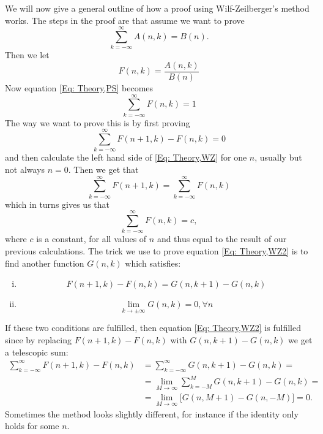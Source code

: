 We will now give a general outline of how a proof using Wilf-Zeilberger's method works. The steps in the proof are that assume we want to prove
\begin{equation}\label{Eq: Theory,PS}
  \sum_{k=-\infty}^\infty A(n,k) = B(n).
\end{equation}
Then we let
\begin{equation}
  F(n,k)=\frac{A(n,k)}{B(n)}
\end{equation}
Now equation \ref{Eq: Theory,PS} becomes
\begin{equation}\label{Eq: Theory,WZ}
  \sum_{k=-\infty}^\infty F(n,k) = 1
\end{equation}
The way we want to prove this is by first proving
\begin{equation}\label{Eq: Theory,WZ2}
  \sum_{k=-\infty}^\infty F(n+1,k)-F(n,k) = 0
\end{equation}
and then calculate the left hand side of \ref{Eq: Theory,WZ} for one $n$, usually but not always $n=0$. Then we get that
\begin{equation}
  \sum_{k=-\infty}^\infty F(n+1,k)=\sum_{k=-\infty}^\infty F(n,k)
\end{equation}
which in turns gives us that
\begin{equation}
  \sum_{k=-\infty}^\infty F(n,k) = c,
\end{equation}
where $c$ is a constant, for all values of $n$ and thus equal to the result of our previous calculations. The trick we use to prove equation \ref{Eq: Theory,WZ2} is to find another function $G(n,k)$ which satisfies:
\begin{enumerate}[i)]
  \item
  \begin{equation}\label{Eq: Theory,first condition}
    F(n+1,k)-F(n,k)=G(n,k+1)-G(n,k)
  \end{equation}
  \item
  \begin{equation}\label{Eq: Theory,second condition}
    \lim_{k\to\pm\infty}G(n,k)=0, \forall n
  \end{equation}
\end{enumerate}
If these two conditions are fulfilled, then equation \ref{Eq: Theory,WZ2} is fulfilled since by replacing $F(n+1,k)-F(n,k)$ with $G(n,k+1)-G(n,k)$ we get a telescopic sum:
\begin{equation*}
\begin{split}
\sum_{k=-\infty}^\infty F(n+1,k)-F(n,k) & = \sum_{k=-\infty}^\infty G(n,k+1)-G(n,k) = \\
 & = \lim_{M\to\infty} \sum_{k=-M}^M G(n,k+1)-G(n,k) = \\
 & = \lim_{M\to\infty} \big[G(n,M+1)-G(n,-M)\big] = 0.
\end{split}
\end{equation*}
Sometimes the method looks slightly different, for instance if the identity only holds for some $n$.

